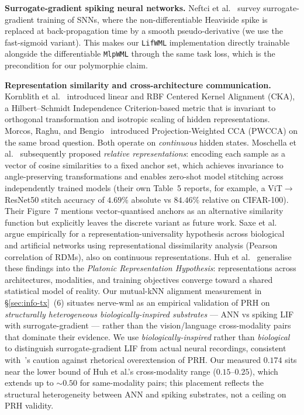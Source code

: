 \documentclass[10pt,twocolumn]{article}
\begin{document}
\textbf{Surrogate-gradient spiking neural networks.} Neftci et al.~\cite{neftci2019surrogate} survey surrogate-gradient training of SNNs, where the non-differentiable Heaviside spike is replaced at back-propagation time by a smooth pseudo-derivative (we use the fast-sigmoid variant). This makes our \texttt{LifWML} implementation directly trainable alongside the differentiable \texttt{MlpWML} through the same task loss, which is the precondition for our polymorphie claim.

\textbf{Representation similarity and cross-architecture communication.} Kornblith et al.~\cite{kornblith2019similarity} introduced linear and RBF Centered Kernel Alignment (CKA), a Hilbert--Schmidt Independence Criterion-based metric that is invariant to orthogonal transformation and isotropic scaling of hidden representations. Morcos, Raghu, and Bengio~\cite{morcos2018insights} introduced Projection-Weighted CCA (PWCCA) on the same broad question. Both operate on \emph{continuous} hidden states. Moschella et al.~\cite{moschella2022relative} subsequently proposed \emph{relative representations}: encoding each sample as a vector of cosine similarities to a fixed anchor set, which achieves invariance to angle-preserving transformations and enables zero-shot model stitching across independently trained models (their own Table~5 reports, for example, a ViT$\to$ResNet50 stitch accuracy of $4.69\%$ absolute vs $84.46\%$ relative on CIFAR-100). Their Figure~7 mentions vector-quantised anchors as an alternative similarity function but explicitly leaves the discrete variant as future work. Saxe et al.~\cite{saxe2024universality} argue empirically for a representation-universality hypothesis across biological and artificial networks using representational dissimilarity analysis (Pearson correlation of RDMs), also on continuous representations. Huh et al.~\cite{huh2024platonic} generalise these findings into the \emph{Platonic Representation Hypothesis}: representations across architectures, modalities, and training objectives converge toward a shared statistical model of reality. Our mutual-kNN alignment measurement in \S\ref{sec:info-tx}~(6) situates nerve-wml as an empirical validation of PRH on \emph{structurally heterogeneous biologically-inspired substrates} --- ANN vs spiking LIF with surrogate-gradient --- rather than the vision/language cross-modality pairs that dominate their evidence. We use \emph{biologically-inspired} rather than \emph{biological} to distinguish surrogate-gradient LIF from actual neural recordings, consistent with~\cite{aristotelianprh2026}'s caution against rhetorical overextension of PRH. Our measured $0.174$ sits near the lower bound of Huh et al.'s cross-modality range ($0.15$--$0.25$), which extends up to $\sim 0.50$ for same-modality pairs; this placement reflects the structural heterogeneity between ANN and spiking substrates, not a ceiling on PRH validity.
\end{document}
